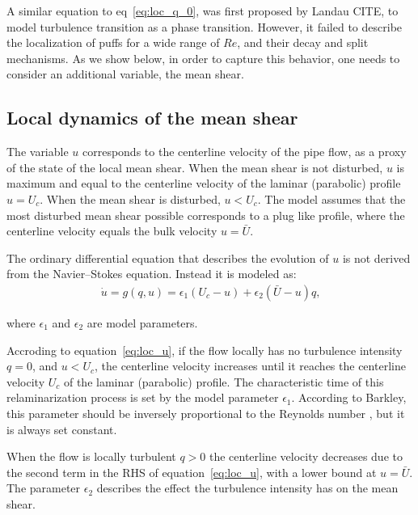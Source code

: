 \documentclass{article}
\begin{document}
A similar equation to eq~\ref{eq:loc_q_0}, was first proposed by Landau CITE, to model turbulence transition as a phase transition. However, it failed to describe the localization of puffs for a wide range of $Re$, and their decay and split mechanisms. As we show below, in order to capture this behavior, one needs to consider an additional variable, the mean shear.






\subsection{Local dynamics of the mean shear}
The variable $u$ corresponds to the centerline velocity of the pipe flow, as a proxy of the state of the local mean shear. When the mean shear is not disturbed, $u$ is maximum and equal to the centerline velocity of the laminar (parabolic) profile $u=U_{c}$. When the mean shear is disturbed, $u<U_{c}$. The model assumes that the most disturbed mean shear possible corresponds to a plug like profile, where the centerline velocity equals the bulk velocity $u=\bar{U}$. 

The ordinary differential equation that describes the evolution of $u$ is not derived from the Navier--Stokes equation. Instead it is modeled as:
\begin{align}
\dot{u}=g\left(q,u\right)= \epsilon_{1} \left(U_{c}-u \right) + \epsilon_{2} \left(\bar{U}-u \right)q \text{,}
\label{eq:loc_u}
\end{align}

where $\epsilon_{1}$ and $\epsilon_{2}$ are model parameters. 

Accroding to equation~\ref{eq:loc_u}, if the flow locally has no turbulence intensity $q=0$, and $u<U_{c}$, the centerline velocity increases until it reaches the centerline velocity $U_{c}$ of the laminar (parabolic) profile. The characteristic time of this relaminarization process is set by the model parameter $\epsilon_{1}$. According to Barkley, this parameter should be inversely proportional to the Reynolds number \cite{barkley2016}, but it is always set constant. 

When the flow is locally turbulent $q>0$ the centerline velocity decreases due to the second term in the RHS of equation~\ref{eq:loc_u}, with a lower bound at $u=\bar{U}$. The parameter $\epsilon_{2}$ describes the effect the turbulence intensity has on the mean shear. 


\end{document}
